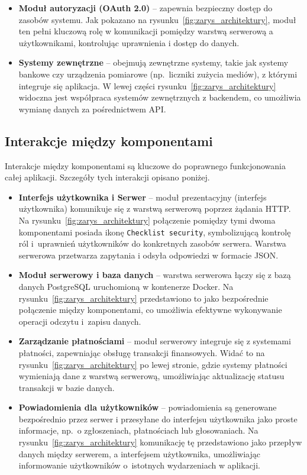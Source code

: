 \begin{itemize}
    \item \textbf{Moduł autoryzacji (OAuth 2.0)} -- zapewnia bezpieczny dostęp do zasobów systemu. Jak pokazano na rysunku~\ref{fig:zarys_architektury}, moduł ten pełni kluczową rolę w komunikacji pomiędzy warstwą serwerową a użytkownikami, kontrolując uprawnienia i dostęp do danych.

    \item \textbf{Systemy zewnętrzne} -- obejmują zewnętrzne systemy, takie jak systemy bankowe czy urządzenia pomiarowe (np.\ liczniki zużycia mediów), z którymi integruje się aplikacja. W lewej części rysunku~\ref{fig:zarys_architektury} widoczna jest współpraca systemów zewnętrznych z backendem, co umożliwia wymianę danych za pośrednictwem API.
		
\end{itemize}  


\subsection{Interakcje między komponentami}
Interakcje między komponentami są kluczowe do poprawnego funkcjonowania całej aplikacji. Szczegóły tych interakcji opisano poniżej. 

\begin{itemize}

	\item \textbf{Interfejs użytkownika i Serwer} -- moduł prezentacyjny (interfejs użytkownika) komunikuje się z warstwą serwerową poprzez żądania HTTP. Na rysunku~\ref{fig:zarys_architektury} połączenie pomiędzy tymi dwoma komponentami posiada ikonę \texttt{Checklist security}, symbolizującą kontrolę ról i~uprawnień użytkowników do konkretnych zasobów serwera. Warstwa serwerowa przetwarza zapytania i odsyła odpowiedzi w formacie JSON.

	\item \textbf{Moduł serwerowy i baza danych} -- warstwa serwerowa łączy się z bazą danych PostgreSQL uruchomioną w kontenerze Docker. Na rysunku~\ref{fig:zarys_architektury} przedstawiono to jako bezpośrednie połączenie między komponentami, co umożliwia efektywne wykonywanie operacji odczytu i~zapisu danych.

	\item \textbf{Zarządzanie płatnościami} -- moduł serwerowy integruje się z systemami płatności, zapewniając obsługę transakcji finansowych. Widać to na rysunku~\ref{fig:zarys_architektury} po lewej stronie, gdzie systemy płatności wymieniają dane z warstwą serwerową, umożliwiając aktualizację statusu transakcji w bazie danych.

	\item \textbf{Powiadomienia dla użytkowników} -- powiadomienia są generowane bezpośrednio przez serwer i przesyłane do interfejsu użytkownika jako proste informacje, np.\ o zgłoszeniach, płatnościach lub głosowaniach. Na rysunku~\ref{fig:zarys_architektury} komunikację tę przedstawiono jako przepływ danych między serwerem, a interfejsem użytkownika, umożliwiając informowanie użytkowników o~istotnych wydarzeniach w aplikacji.
	
\end{itemize}


